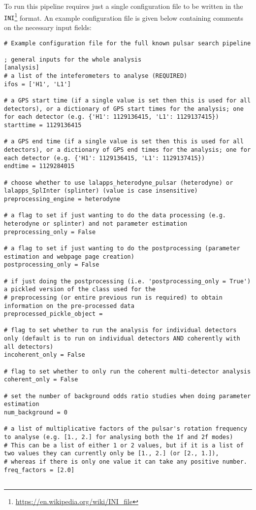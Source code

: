 To run this pipeline requires just a single configuration file to be written in the {\tt INI}\footnote{\url{https://en.wikipedia.org/wiki/INI_file}} format. An
example configuration file is given below containing comments on the necessary input fields:
\begin{lstlisting}[frame=single,basicstyle=\tiny\ttfamily]
# Example configuration file for the full known pulsar search pipeline

; general inputs for the whole analysis
[analysis]
# a list of the inteferometers to analyse (REQUIRED)
ifos = ['H1', 'L1']

# a GPS start time (if a single value is set then this is used for all detectors), or a dictionary of GPS start times for the analysis; one for each detector (e.g. {'H1': 1129136415, 'L1': 1129137415})
starttime = 1129136415

# a GPS end time (if a single value is set then this is used for all detectors), or a dictionary of GPS end times for the analysis; one for each detector (e.g. {'H1': 1129136415, 'L1': 1129137415})
endtime = 1129284015

# choose whether to use lalapps_heterodyne_pulsar (heterodyne) or lalapps_SplInter (splinter) (value is case insensitive)
preprocessing_engine = heterodyne

# a flag to set if just wanting to do the data processing (e.g. heterodyne or splinter) and not parameter estimation
preprocessing_only = False

# a flag to set if just wanting to do the postprocessing (parameter estimation and webpage page creation)
postprocessing_only = False

# if just doing the postprocessing (i.e. 'postprocessing_only = True') a pickled version of the class used for the
# preprocessing (or entire previous run is required) to obtain information on the pre-processed data
preprocessed_pickle_object =

# flag to set whether to run the analysis for individual detectors only (default is to run on individual detectors AND coherently with all detectors)
incoherent_only = False

# flag to set whether to only run the coherent multi-detector analysis
coherent_only = False

# set the number of background odds ratio studies when doing parameter estimation
num_background = 0

# a list of multiplicative factors of the pulsar's rotation frequency to analyse (e.g. [1., 2.] for analysing both the 1f and 2f modes)
# This can be a list of either 1 or 2 values, but if it is a list of two values they can currently only be [1., 2.] (or [2., 1.]),
# whereas if there is only one value it can take any positive number.
freq_factors = [2.0]


\end{lstlisting}
